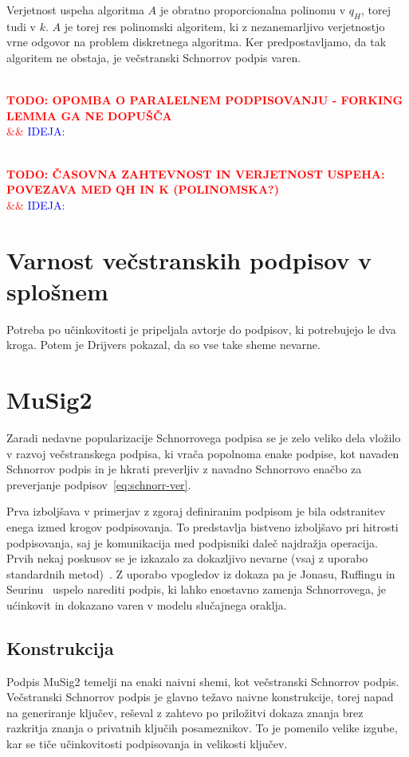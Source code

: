 \documentclass[isrm2, tisk]{fmfdelo}
\newcommand{\todo}[2][]{%
    \textcolor{red}{%
        \\ \textbf{\uppercase{todo: #2}}%
        \\%
        \ifx&#1&%
        \else%
            \textcolor{blue}{\uppercase{ideja:} #1}%
            \\%
        \fi%
    }%
}
\begin{document}
Verjetnost uspeha algoritma $A$ je obratno proporcionalna polinomu v $q_H$, torej tudi v $k$. $A$ 
je torej res polinomski algoritem, ki z nezanemarljivo verjetnostjo vrne odgovor na problem diskretnega
algoritma. Ker predpostavljamo, da tak algoritem ne obstaja, je večstranski Schnorrov podpis varen.

\todo{opomba o paralelnem podpisovanju - forking lemma ga ne dopušča}
\todo{časovna zahtevnost in verjetnost uspeha: povezava med qH in k (polinomska?)}

\section{Varnost večstranskih podpisov v splošnem}
\label{sec:varnost}
Potreba po učinkovitosti je pripeljala avtorje do podpisov, ki potrebujejo le dva kroga. Potem je 
Drijvers pokazal, da so vse take sheme nevarne.

\section{MuSig2}
\label{sec:musig2}
Zaradi nedavne popularizacije Schnorrovega podpisa se je zelo veliko dela vložilo v razvoj večstranskega
podpisa, ki vrača popolnoma enake podpise, kot navaden Schnorrov podpis in je hkrati preverljiv
z navadno Schnorrovo enačbo za preverjanje podpisov~\eqref{eq:schnorr-ver}. 

Prva izboljšava v primerjav z zgoraj definiranim podpisom je bila odstranitev enega izmed krogov
podpisovanja. To predstavlja bistveno izboljšavo pri hitrosti podpisovanja, saj je komunikacija
med podpisniki daleč najdražja operacija. Prvih nekaj poskusov se je izkazalo za dokazljivo nevarne
(vsaj z uporabo standardnih metod)~\cite{drijvers2019security}. Z uporabo vpogledov iz dokaza pa je 
Jonasu, Ruffingu in Seurinu~\cite{jonas2020musig2} uspelo narediti podpis, ki lahko enostavno zamenja
Schnorrovega, je ućinkovit in dokazano varen v modelu slučajnega oraklja.

\subsection{Konstrukcija}
Podpis MuSig2 temelji na enaki naivni shemi, kot večstranski Schnorrov podpis. Večstranski Schnorrov
podpis je glavno težavo naivne konstrukcije, torej napad na generiranje ključev, reševal z zahtevo
po priložitvi dokaza znanja brez razkritja znanja o privatnih ključih posameznikov. To je pomenilo
velike izgube, kar se tiče učinkovitosti podpisovanja in velikosti ključev.
\end{document}
